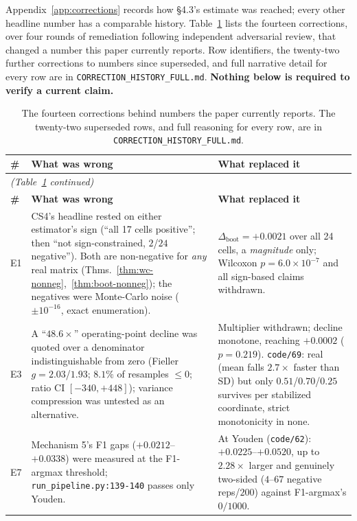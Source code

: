 \documentclass[10pt]{article} %
\begin{document}
Appendix~\ref{app:corrections} records how §4.3's estimate was reached; every
other headline number has a comparable history. Table~\ref{tab:appendixE-corrections}
lists the fourteen corrections, over four rounds of remediation following
independent adversarial review, that changed a number this paper currently
reports. Row identifiers, the twenty-two further corrections to numbers since
superseded, and full narrative detail for every row are in
\texttt{CORRECTION\_HISTORY\_FULL.md}. \textbf{Nothing below is required to
verify a current claim.}

\footnotesize
\setlength{\tabcolsep}{3pt}
\begin{longtable}{@{}p{}p{}p{}@{}}
\caption{The fourteen corrections behind numbers the paper currently reports. The twenty-two superseded rows, and full reasoning for every row, are in \texttt{CORRECTION\_HISTORY\_FULL.md}.}
\label{tab:appendixE-corrections}\\
\toprule
\textbf{\#} & \textbf{What was wrong} & \textbf{What replaced it} \\
\midrule
\endfirsthead
\multicolumn{3}{l}{\textit{(Table~\ref{tab:appendixE-corrections} continued)}}\\
\toprule
\textbf{\#} & \textbf{What was wrong} & \textbf{What replaced it} \\
\midrule
\endhead
\bottomrule
\endlastfoot

E1 & CS4's headline rested on either estimator's sign (``all 17 cells positive''; then ``not sign-constrained, $2$/$24$ negative''). Both are non-negative for \emph{any} real matrix (Thms.~\ref{thm:wc-nonneg},~\ref{thm:boot-nonneg}); the negatives were Monte-Carlo noise ($\pm10^{-16}$, exact enumeration). &
$\Delta_{\text{boot}}=+0.0021$ over all 24 cells, a \emph{magnitude} only; Wilcoxon $p=6.0\times10^{-7}$ and all sign-based claims withdrawn. \\

E3 & A ``$48.6\times$'' operating-point decline was quoted over a denominator indistinguishable from zero (Fieller $g=2.03$/$1.93$; $8.1\%$ of resamples $\le0$; ratio CI $[-340,+448]$); variance compression was untested as an alternative. &
Multiplier withdrawn; decline monotone, reaching $+0.0002$ ($p=0.219$). \texttt{code/69}: real (mean falls $2.7\times$ faster than SD) but only $0.51$/$0.70$/$0.25$ survives per stabilized coordinate, strict monotonicity in none. \\

E7 & Mechanism 5's F1 gaps ($+0.0212$--$+0.0338$) were measured at the F1-argmax threshold; \texttt{run\_pipeline.py:139-140} passes only Youden. &
At Youden (\texttt{code/62}): $+0.0225$--$+0.0520$, up to $2.28\times$ larger and genuinely two-sided ($4$--$67$ negative reps/$200$) against F1-argmax's $0/1000$. \\


\end{longtable}
\end{document}
